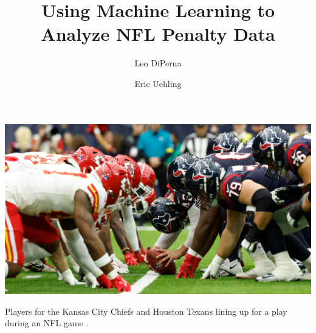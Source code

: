 \documentclass[sigconf, nonacm]{acmart}
\begin{document}
\title{Using Machine Learning to Analyze NFL Penalty Data}


\author{Leo DiPerna}

\author{Eric Uehling}

\renewcommand{\shortauthors}{DiPerna and Uehling}

\begin{teaserfigure}
  \includegraphics[width=\textwidth]{images/football_picture}
  \caption{Players for the Kansas City Chiefs and Houston Texans lining up for a
           play during an NFL game \cite{NYTImage}.}
  \label{fig:teaser}
\end{teaserfigure}

\maketitle
\end{document}
